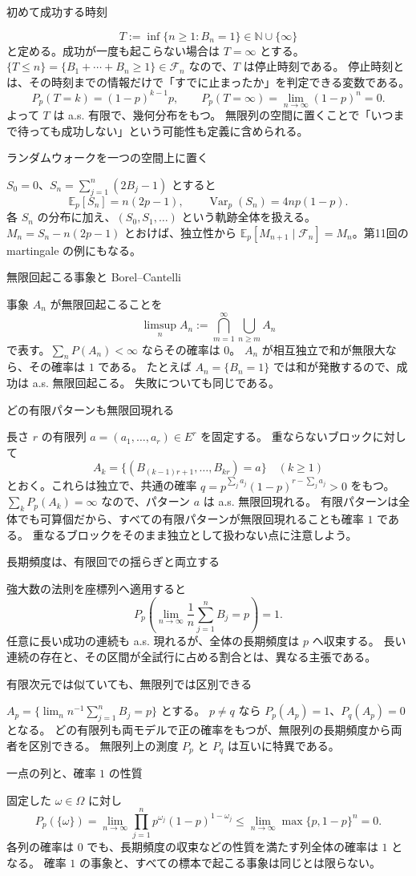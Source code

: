 \documentclass[a4paper,10pt,pdflatex,ja=standard,jafont=ipaex-type1,
  magstyle=real,scale=1]{bxjsarticle}
\newcommand{\topic}[1]{\par\vspace{5pt}
  {\large\sffamily\mdseries\color{accent}#1}\par\vspace{2pt}}
\newcommand{\F}{\mathcal F}
\newcommand{\N}{\mathbb N}
\newcommand{\E}{\mathbb E}
\newcommand{\Var}{\operatorname{Var}}
\begin{document}
\topic{初めて成功する時刻}
$$T:=\inf\{n\ge1:B_n=1\}\in\N\cup\{\infty\}$$
と定める。成功が一度も起こらない場合は $T=\infty$ とする。
$\{T\le n\}=\{B_1+\cdots+B_n\ge1\}\in\F_n$ なので、$T$ は停止時刻である。
停止時刻とは、その時刻までの情報だけで「すでに止まったか」を判定できる変数である。
$$P_p(T=k)=(1-p)^{k-1}p,\qquad
 P_p(T=\infty)=\lim_{n\to\infty}(1-p)^n=0.$$
よって $T$ は a.s. 有限で、幾何分布をもつ。
無限列の空間に置くことで「いつまで待っても成功しない」という可能性も定義に含められる。

\topic{ランダムウォークを一つの空間上に置く}
$S_0=0$、$S_n=\sum_{j=1}^n(2B_j-1)$ とすると
$$\E_p[S_n]=n(2p-1),\qquad\Var_p(S_n)=4np(1-p).$$
各 $S_n$ の分布に加え、$(S_0,S_1,\ldots)$ という軌跡全体を扱える。
$M_n=S_n-n(2p-1)$ とおけば、独立性から
$\E_p[M_{n+1}\mid\F_n]=M_n$。第11回の martingale の例にもなる。

\newpage
\topic{無限回起こる事象と Borel--Cantelli}
事象 $A_n$ が無限回起こることを
$$\limsup_n A_n:=\bigcap_{m=1}^\infty\bigcup_{n\ge m}A_n$$
で表す。$\sum_nP(A_n)<\infty$ ならその確率は $0$。
$A_n$ が相互独立で和が無限大なら、その確率は $1$ である。
たとえば $A_n=\{B_n=1\}$ では和が発散するので、成功は a.s. 無限回起こる。
失敗についても同じである。

\topic{どの有限パターンも無限回現れる}
長さ $r$ の有限列 $a=(a_1,\ldots,a_r)\in E^r$ を固定する。
重ならないブロックに対して
$$A_k=\{(B_{(k-1)r+1},\ldots,B_{kr})=a\}\quad(k\ge1)$$
とおく。これらは独立で、共通の確率
$q=p^{\sum_j a_j}(1-p)^{r-\sum_j a_j}>0$ をもつ。
$\sum_kP_p(A_k)=\infty$ なので、パターン $a$ は a.s. 無限回現れる。
有限パターンは全体でも可算個だから、すべての有限パターンが無限回現れることも確率 $1$ である。
重なるブロックをそのまま独立として扱わない点に注意しよう。

\topic{長期頻度は、有限回での揺らぎと両立する}
強大数の法則を座標列へ適用すると
$$P_p\left(\lim_{n\to\infty}\frac1n\sum_{j=1}^nB_j=p\right)=1.$$
任意に長い成功の連続も a.s. 現れるが、全体の長期頻度は $p$ へ収束する。
長い連続の存在と、その区間が全試行に占める割合とは、異なる主張である。

\topic{有限次元では似ていても、無限列では区別できる}
$A_p=\{\lim_n n^{-1}\sum_{j=1}^nB_j=p\}$ とする。
$p\ne q$ なら $P_p(A_p)=1$、$P_q(A_p)=0$ となる。
どの有限列も両モデルで正の確率をもつが、無限列の長期頻度から両者を区別できる。
無限列上の測度 $P_p$ と $P_q$ は互いに特異である。

\topic{一点の列と、確率 $1$ の性質}
固定した $\omega\in\Omega$ に対し
$$P_p(\{\omega\})=\lim_{n\to\infty}
 \prod_{j=1}^n p^{\omega_j}(1-p)^{1-\omega_j}
 \le\lim_{n\to\infty}\max\{p,1-p\}^n=0.$$
各列の確率は $0$ でも、長期頻度の収束などの性質を満たす列全体の確率は $1$ となる。
確率 $1$ の事象と、すべての標本で起こる事象は同じとは限らない。
\end{document}
